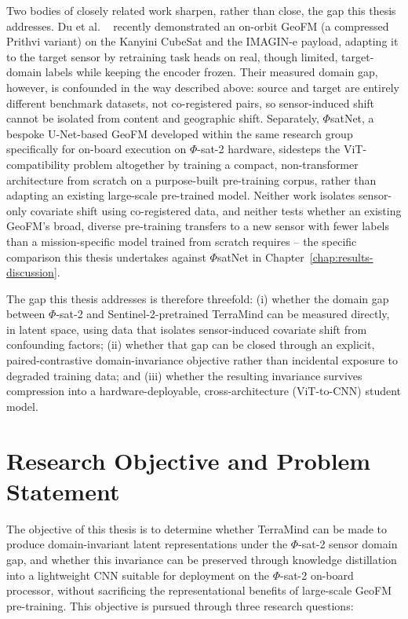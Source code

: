 Two bodies of closely related work sharpen, rather than close, the gap this thesis addresses.
Du et al.
\ \cite{du2025onorbitdemonstrationgeospatialfoundation} recently demonstrated an on-orbit GeoFM (a compressed Prithvi variant) on the Kanyini CubeSat and the IMAGIN-e payload, adapting it to the target sensor by retraining task heads on real, though limited, target-domain labels while keeping the encoder frozen.
Their measured domain gap, however, is confounded in the way described above: source and target are entirely different benchmark datasets, not co-registered pairs, so sensor-induced shift cannot be isolated from content and geographic shift.
Separately, $\Phi$satNet, a bespoke U-Net-based GeoFM developed within the same research group specifically for on-board execution on $\Phi$-sat-2 hardware, sidesteps the ViT-compatibility problem altogether by training a compact, non-transformer architecture from scratch on a purpose-built pre-training corpus, rather than adapting an existing large-scale pre-trained model.
Neither work isolates sensor-only covariate shift using co-registered data, and neither tests whether an existing GeoFM's broad, diverse pre-training transfers to a new sensor with fewer labels than a mission-specific model trained from scratch requires -- the specific comparison this thesis undertakes against $\Phi$satNet in Chapter~\ref{chap:results-discussion}.

The gap this thesis addresses is therefore threefold: (i) whether the domain gap between $\Phi$-sat-2 and Sentinel-2-pretrained TerraMind can be measured directly, in latent space, using data that isolates sensor-induced covariate shift from confounding factors; (ii) whether that gap can be closed through an explicit, paired-contrastive domain-invariance objective rather than incidental exposure to degraded training data; and (iii) whether the resulting invariance survives compression into a hardware-deployable, cross-architecture (ViT-to-CNN) student model.

\section{Research Objective and Problem Statement}
\label{sec:research-objective}

The objective of this thesis is to determine whether TerraMind can be made to produce domain-invariant latent representations under the $\Phi$-sat-2 sensor domain gap, and whether this invariance can be preserved through knowledge distillation into a lightweight CNN suitable for deployment on the $\Phi$-sat-2 on-board processor, without sacrificing the representational benefits of large-scale GeoFM pre-training.
This objective is pursued through three research questions:

